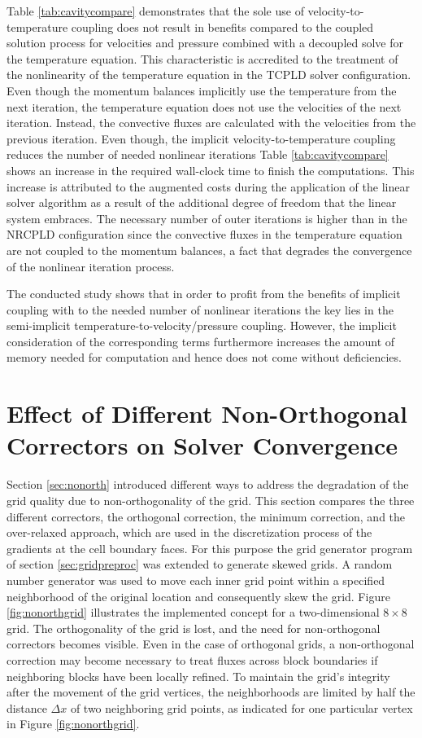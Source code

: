 Table \ref{tab:cavitycompare} demonstrates that the sole use of velocity-to-temperature coupling does not result in benefits compared to the coupled solution process for velocities and pressure combined with a decoupled solve for the temperature equation. This characteristic is accredited to the treatment of the nonlinearity of the temperature equation in the TCPLD solver configuration. Even though the momentum balances implicitly use the temperature from the next iteration, the temperature equation does not use the velocities of the next iteration. Instead, the convective fluxes are calculated with the velocities from the previous iteration. Even though, the implicit velocity-to-temperature coupling reduces the number of needed nonlinear iterations Table \ref{tab:cavitycompare} shows an increase in the required wall-clock time to finish the computations. This increase is attributed to the augmented costs during the application of the linear solver algorithm as a result of the additional degree of freedom that the linear system embraces. The necessary number of outer iterations is higher than in the NRCPLD configuration since the convective fluxes in the temperature equation are not coupled to the momentum balances, a fact that degrades the convergence of the nonlinear iteration process.

The conducted study shows that in order to profit from the benefits of implicit coupling with to the needed number of nonlinear iterations the key lies in the semi-implicit temperature-to-velocity/pressure coupling. However, the implicit consideration of the corresponding terms furthermore increases the amount of memory needed for computation and hence does not come without deficiencies.

\section{Effect of Different Non-Orthogonal Correctors on Solver Convergence}
\label{sec:studynonorth}

Section \ref{sec:nonorth} introduced different ways to address the degradation of the grid quality due to non-orthogonality of the grid. This section compares the three different correctors, the orthogonal correction, the minimum correction, and the over-relaxed approach, which are used in the discretization process of the gradients at the cell boundary faces. For this purpose the grid generator program of section \ref{sec:gridpreproc} was extended to generate skewed grids. A random number generator was used to move each inner grid point within a specified neighborhood of the original location and consequently skew the grid. Figure \ref{fig:nonorthgrid} illustrates the implemented concept for a two-dimensional \(8 \times 8\) grid. The orthogonality of the grid is lost, and the need for non-orthogonal correctors becomes visible. Even in the case of orthogonal grids, a non-orthogonal correction may become necessary to treat fluxes across block boundaries if neighboring blocks have been locally refined. To maintain the grid's integrity after the movement of the grid vertices, the neighborhoods are limited by half the distance \(\Delta x\) of two neighboring grid points, as indicated for one particular vertex in Figure \ref{fig:nonorthgrid}.


